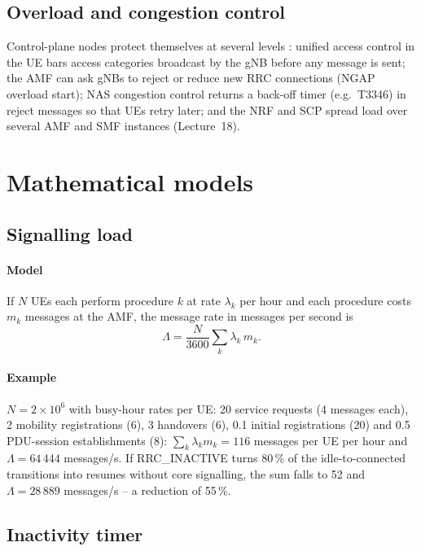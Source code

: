 \documentclass[11pt,a4paper]{article}
\begin{document}
\subsection{Overload and congestion control}
Control-plane nodes protect themselves at several levels \cite{ts23501,ts24501}: unified access control in the UE bars access categories
broadcast by the gNB before any message is sent; the AMF can ask gNBs to reject or reduce new RRC connections (NGAP overload start); NAS
congestion control returns a back-off timer (e.g.\ T3346) in reject messages so that UEs retry later; and the NRF and SCP spread load
over several AMF and SMF instances (Lecture~18).

\section{Mathematical models}

\subsection{Signalling load}\label{sec:load}
\paragraph{Model} If $N$ UEs each perform procedure $k$ at rate $\lambda_k$ per hour and each procedure costs $m_k$ messages at the AMF, the
message rate in messages per second is
\begin{equation}\label{eq:load}
  \Lambda = \frac{N}{3600} \sum_{k} \lambda_k\, m_k .
\end{equation}
\paragraph{Example} $N = 2\times10^{6}$ with busy-hour rates per UE: 20 service requests (4 messages each), 2 mobility registrations (6), 3
handovers (6), 0.1 initial registrations (20) and 0.5 PDU-session establishments (8): $\sum_k \lambda_k m_k = 116$ messages per UE per hour and
$\Lambda = 64\,444$ messages/s. If RRC\_INACTIVE turns 80\,\% of the idle-to-connected transitions into resumes without core signalling, the sum
falls to 52 and $\Lambda = 28\,889$ messages/s -- a reduction of 55\,\%.

\subsection{Inactivity timer}\label{sec:timer}
\end{document}
